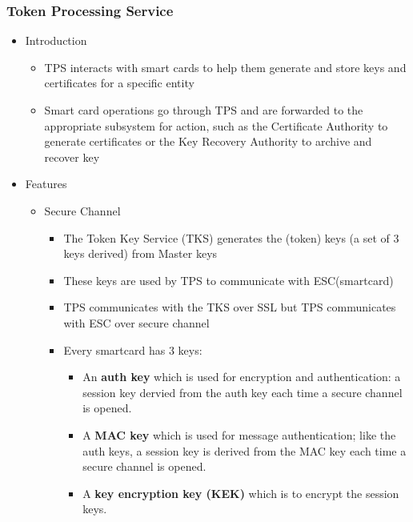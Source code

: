 \documentclass[a4paper]{article}
\begin{document}
\subsubsection{Token Processing Service}
    \begin{itemize}
            \item Introduction
                \begin{itemize}
                    \item TPS interacts with smart cards to help them generate and store keys and certificates for a specific entity
                    \item Smart card operations go through TPS and are forwarded to the appropriate subsystem for action, 
                        such as the Certificate Authority to generate certificates or the Key Recovery Authority to archive and recover key
                \end{itemize}
            \item Features
                \begin{itemize}
                    \item Secure Channel
                        \begin{itemize}
                            \item The Token Key Service (TKS) generates the (token) keys (a set of 3 keys derived) from Master keys
                            \item These keys are used by TPS to communicate with ESC(smartcard)
                            \item TPS communicates with the TKS over SSL but TPS communicates with ESC over secure channel
                            \item Every smartcard has 3 keys:
                                \begin{itemize}
                                    \item An \textbf{auth key} which is used for encryption and authentication: a session key dervied from the auth key
                                        each time a secure channel is opened.
                                    \item A \textbf{MAC key} which is used for message authentication; like the auth keys, a session key is derived
                                        from the MAC key each time a secure channel is opened.
                                    \item A \textbf{key encryption key (KEK)} which is to encrypt the session keys.

\end{itemize}
\end{itemize}
\end{itemize}
\end{itemize}
\end{document}
